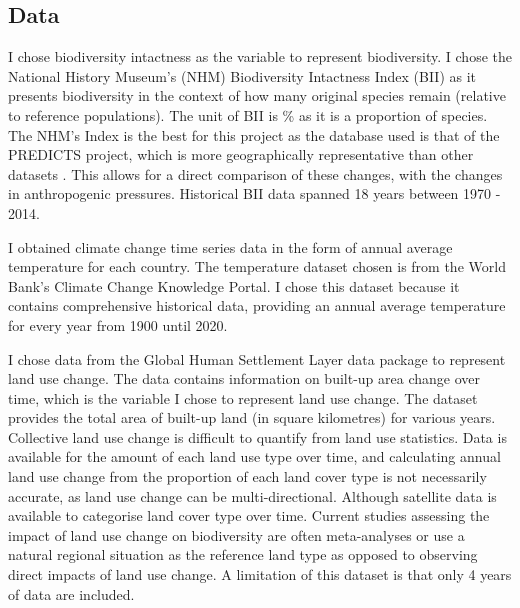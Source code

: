 \documentclass[11pt, a4paper, titlepage]{article}
\begin{document}
	\subsection*{Data}
	I chose biodiversity intactness as the variable to represent biodiversity. I chose the National History Museum's (NHM) Biodiversity Intactness Index (BII)\citep{phillips2021} as it presents biodiversity in the context of how many original species remain (relative to reference populations). The unit of BII is \% as it is a proportion of species. The NHM's Index is the best for this project as the database used is that of the PREDICTS project, which is more geographically representative than other datasets \citep{purvis2018modelling}. This allows for a direct comparison of these changes, with the changes in anthropogenic pressures. Historical BII data spanned 18 years between 1970 - 2014. 
	
	I obtained climate change time series data in the form of annual average temperature for each country. The temperature dataset chosen is from the World Bank's Climate Change Knowledge Portal. I chose this dataset because it contains comprehensive historical data, providing an annual average temperature for every year from 1900 until 2020. 
	
	I chose data from the Global Human Settlement Layer data package \citep{JRC117104} to represent land use change. The data contains information on built-up area change over time, which is the variable I chose to represent land use change. The dataset provides the total area of built-up land (in square kilometres) for various years. Collective land use change is difficult to quantify from land use statistics. Data is available for the amount of each land use type over time, and calculating annual land use change from the proportion of each land cover type is not necessarily accurate, as land use change can be multi-directional. Although satellite data is available to categorise land cover type over time. Current studies assessing the impact of land use change on biodiversity are often meta-analyses or use a natural regional situation as the reference land type \citep{de2013land} as opposed to observing direct impacts of land use change. A limitation of this dataset is that only 4 years of data are included. 
	
\end{document}

